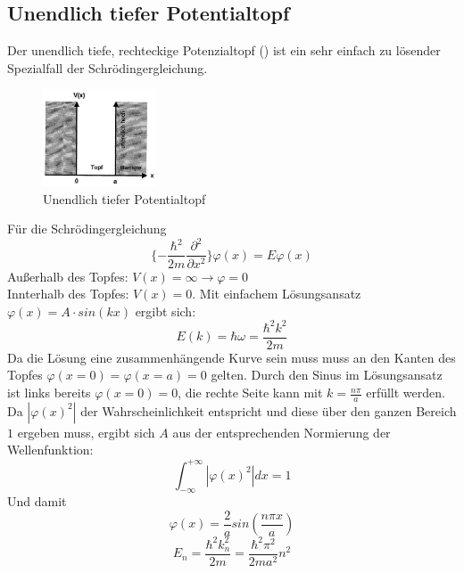\documentclass{article}
\begin{document}
\subsection{Unendlich tiefer Potentialtopf }\label{k1:pottopf}
Der unendlich tiefe, rechteckige Potenzialtopf () ist ein sehr einfach zu lösender Spezialfall
der Schrödingergleichung.
\begin{figure}[H]
    \centering
    \includegraphics[width=0.3\textwidth]{fig/potentialtopf}
    \caption{Unendlich tiefer Potentialtopf}
    \label{fig:pottopf}
\end{figure}
Für die Schrödingergleichung
\begin{equation}
    \{-\frac{\hbar^2}{2m}\frac{\partial^2}{\partial x^2} \}\varphi(x) = E \varphi(x)
\end{equation}
Außerhalb des Topfes: $V(x) = \infty \rightarrow \varphi = 0$\\
Innterhalb des Topfes: $V(x) = 0$. Mit einfachem Lösungsansatz $\varphi (x) = A\cdot sin(kx)$ ergibt sich:
\begin{equation}
    E(k) = \hbar \omega = \frac{\hbar^2 k^2}{2m}
\end{equation}
Da die Lösung eine zusammenhängende Kurve sein muss muss an den Kanten des Topfes $\varphi(x=0) = \varphi(x=a) = 0$ gelten.
Durch den Sinus im Lösungsansatz ist links bereits $\varphi(x=0) = 0$, die rechte Seite kann mit $k = \frac{n\pi}{a}$ erfüllt werden.\\
Da $|\varphi(x)^2|$ der Wahrscheinlichkeit entspricht und diese über den ganzen Bereich $1$ ergeben muss, ergibt sich $A$ aus
der entsprechenden Normierung der Wellenfunktion:
\begin{equation}
    \int_{-\infty}^{+\infty} |\varphi(x)^2| dx = 1
\end{equation}
Und damit
\begin{equation}
    \varphi(x) = \frac{2}{a}sin(\frac{n\pi x}{a})
\end{equation}
\begin{equation}
    E_n = \frac{\hbar^2k_n^2}{2m} = \frac{\hbar^2\pi^2}{2ma^2}n^2
\end{equation}
\end{document}
